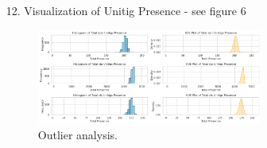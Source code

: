 \documentclass[manuscript,screen,review, nonacm]{acmart}
\begin{document}
\begin{itemize}
    \item[12.] Visualization of Unitig Presence - see figure 6
        \begin{figure}[H]
            \centering
            \vspace{-10pt}
            \includegraphics[width=0.7\textwidth]{figures/unitighist.png}
            \caption{Outlier analysis.}
            \vspace{-10pt}
        \end{figure}


\end{itemize}
\end{document}
